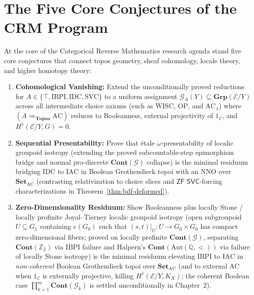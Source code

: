 \documentclass[10pt,twoside,openright]{book}
\theoremstyle{crmplain}
\theoremstyle{crmdef}
\theoremstyle{crmremark}
\begin{document}
\section{The Five Core Conjectures of the CRM Program}\label{sec:five-core-conjectures}

At the core of the Categorical Reverse Mathematics research agenda stand five core conjectures that connect topos geometry, sheaf cohomology, locale theory, and higher homotopy theory:

\begin{enumerate}[label=\textbf{\arabic*.},leftmargin=1.8em]

  \item \textbf{Cohomological Vanishing:} Extend the unconditionally proved reductions for $A \in \{\top, \mathrm{IBPI}, \mathrm{IDC}, \mathrm{SVC}\}$ to a uniform assignment $\mathcal{G}_A(Y) \subseteq \mathbf{Grp}(\mathcal{E}/Y)$ across all intermediate choice axioms (such as $\mathrm{WISC}$, $\mathrm{OP}$, and $\mathrm{AC}_\lambda$) where $(A \Rightarrow_{\mathbf{Topos}} \mathrm{AC})$ reduces to Booleanness, external projectivity of $1_{\mathcal{E}}$, and $H^1(\mathcal{E}/Y, G) = 0$.

  \item \textbf{Sequential Presentability:} Prove that \'etale $\omega$-presentability of localic groupoid isotropy (extending the proved subcountable-step epimorphism bridge and normal pro-discrete $\mathbf{Cont}(\mathcal{G})$ collapse) is the minimal residuum bridging $\mathrm{IDC}$ to $\mathrm{IAC}$ in Boolean Grothendieck topoi with an $\mathrm{NNO}$ over $\mathbf{Set}_{\mathrm{AC}}$ (contrasting relativization to choice slices and $\mathsf{ZF}$ $\mathsf{SVC}$-forcing characterizations in Theorem~\ref{thm:bdf-deformed}).

  \item \textbf{Zero-Dimensionality Residuum:} Show Booleanness plus locally Stone / locally profinite Joyal--Tierney localic groupoid isotropy (open subgroupoid $U \subseteq G_1$ containing $e(G_0)$ such that $(s, t)|_U : U \to G_0 \times G_0$ has compact zero-dimensional fibers; proved on locally profinite $\mathbf{Cont}(\mathcal{G})$, separating $\mathbf{Cont}(\mathbb{Z}_2)$ via $\mathrm{IBPI}$ failure and Halpern's $\mathbf{Cont}(\mathrm{Aut}(\mathbb{Q}, <))$ via failure of locally Stone isotropy) is the minimal residuum elevating $\mathrm{IBPI}$ to $\mathrm{IAC}$ in \emph{non-coherent} Boolean Grothendieck topoi over $\mathbf{Set}_{\mathrm{AC}}$ (and to external $\mathrm{AC}$ when $1_{\mathcal{E}}$ is externally projective, killing $H^1(\mathcal{E}/Y, K_X)$; the coherent Boolean case $\prod_{k=1}^m \mathbf{Cont}(\mathcal{G}_k)$ is settled unconditionally in Chapter~2).


\end{enumerate}
\end{document}
